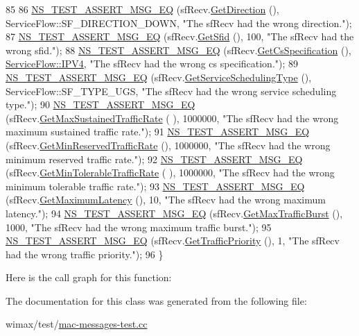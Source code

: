\begin{DoxyCode}
85 
86   \hyperlink{group__testing_ga2a9d78cffb3db8e867c35fff0b698cf5}{NS\_TEST\_ASSERT\_MSG\_EQ} (sfRecv.\hyperlink{classns3_1_1ServiceFlow_a2e18e440a3d3b8a1a06ed8eea1aa8e0a}{GetDirection} (), 
      ServiceFlow::SF\_DIRECTION\_DOWN, \textcolor{stringliteral}{"The sfRecv had the wrong direction."});
87   \hyperlink{group__testing_ga2a9d78cffb3db8e867c35fff0b698cf5}{NS\_TEST\_ASSERT\_MSG\_EQ} (sfRecv.\hyperlink{classns3_1_1ServiceFlow_a3ceebc0cc381b944c902abf46804e9a0}{GetSfid} (), 100, \textcolor{stringliteral}{"The sfRecv had the wrong
       sfid."});
88   \hyperlink{group__testing_ga2a9d78cffb3db8e867c35fff0b698cf5}{NS\_TEST\_ASSERT\_MSG\_EQ} (sfRecv.\hyperlink{classns3_1_1ServiceFlow_af31954524fcd0fa30cc95387975fe20c}{GetCsSpecification} (), 
      \hyperlink{namespacens3_a79988e6e8b09f64c6ffca894994cb033af56451cc069a62c29e3d7577328b5027}{ServiceFlow::IPV4}, \textcolor{stringliteral}{"The sfRecv had the wrong cs specification."});
89   \hyperlink{group__testing_ga2a9d78cffb3db8e867c35fff0b698cf5}{NS\_TEST\_ASSERT\_MSG\_EQ} (sfRecv.\hyperlink{classns3_1_1ServiceFlow_abfcdce94a1409b4951c3cae3cad85e9a}{GetServiceSchedulingType} (), 
      ServiceFlow::SF\_TYPE\_UGS, \textcolor{stringliteral}{"The sfRecv had the wrong service scheduling type."});
90   \hyperlink{group__testing_ga2a9d78cffb3db8e867c35fff0b698cf5}{NS\_TEST\_ASSERT\_MSG\_EQ} (sfRecv.\hyperlink{classns3_1_1ServiceFlow_ad02f7733f156cfd8505c72f8e4eab836}{GetMaxSustainedTrafficRate} (
      ), 1000000, \textcolor{stringliteral}{"The sfRecv had the wrong maximum sustained traffic rate."});
91   \hyperlink{group__testing_ga2a9d78cffb3db8e867c35fff0b698cf5}{NS\_TEST\_ASSERT\_MSG\_EQ} (sfRecv.\hyperlink{classns3_1_1ServiceFlow_aa77c3b70a73e58377ff6103c8719f45c}{GetMinReservedTrafficRate} (),
       1000000, \textcolor{stringliteral}{"The sfRecv had the wrong minimum reserved traffic rate."});
92   \hyperlink{group__testing_ga2a9d78cffb3db8e867c35fff0b698cf5}{NS\_TEST\_ASSERT\_MSG\_EQ} (sfRecv.\hyperlink{classns3_1_1ServiceFlow_a6854fa39a107304708e4610a9df2053d}{GetMinTolerableTrafficRate} (
      ), 1000000, \textcolor{stringliteral}{"The sfRecv had the wrong minimum tolerable traffic rate."});
93   \hyperlink{group__testing_ga2a9d78cffb3db8e867c35fff0b698cf5}{NS\_TEST\_ASSERT\_MSG\_EQ} (sfRecv.\hyperlink{classns3_1_1ServiceFlow_ae801a50e7f8f598b4e343d85a6e6f472}{GetMaximumLatency} (), 10, \textcolor{stringliteral}{"The sfRecv
       had the wrong maximum latency."});
94   \hyperlink{group__testing_ga2a9d78cffb3db8e867c35fff0b698cf5}{NS\_TEST\_ASSERT\_MSG\_EQ} (sfRecv.\hyperlink{classns3_1_1ServiceFlow_af2314ccb8ff8fb93f537e5bccf6c16dc}{GetMaxTrafficBurst} (), 1000, \textcolor{stringliteral}{"The
       sfRecv had the wrong maximum traffic burst."});
95   \hyperlink{group__testing_ga2a9d78cffb3db8e867c35fff0b698cf5}{NS\_TEST\_ASSERT\_MSG\_EQ} (sfRecv.\hyperlink{classns3_1_1ServiceFlow_a8e818b004aeff9d7714d0774846867a5}{GetTrafficPriority} (), 1, \textcolor{stringliteral}{"The
       sfRecv had the wrong traffic priority."});
96 \}
\end{DoxyCode}


Here is the call graph for this function\+:




The documentation for this class was generated from the following file\+:\begin{DoxyCompactItemize}
\item 
wimax/test/\hyperlink{mac-messages-test_8cc}{mac-\/messages-\/test.\+cc}\end{DoxyCompactItemize}
